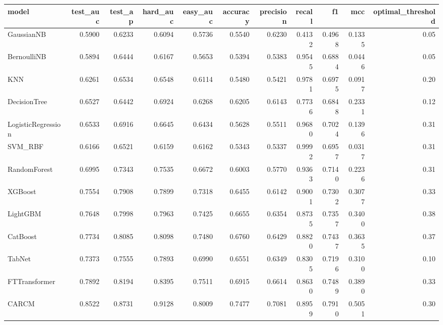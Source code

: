 \begin{tabular}{lrrrrrrrrrr}
\toprule
model & test_auc & test_ap & hard_auc & easy_auc & accuracy & precision & recall & f1 & mcc & optimal_threshold \\
\midrule
GaussianNB & 0.5900 & 0.6233 & 0.6094 & 0.5736 & 0.5540 & 0.6230 & 0.4132 & 0.4968 & 0.1335 & 0.05 \\
BernoulliNB & 0.5894 & 0.6444 & 0.6167 & 0.5653 & 0.5394 & 0.5383 & 0.9545 & 0.6884 & 0.0446 & 0.05 \\
KNN & 0.6261 & 0.6534 & 0.6548 & 0.6114 & 0.5480 & 0.5421 & 0.9781 & 0.6975 & 0.0917 & 0.20 \\
DecisionTree & 0.6527 & 0.6442 & 0.6924 & 0.6268 & 0.6205 & 0.6143 & 0.7736 & 0.6848 & 0.2331 & 0.12 \\
LogisticRegression & 0.6533 & 0.6916 & 0.6645 & 0.6434 & 0.5628 & 0.5511 & 0.9680 & 0.7024 & 0.1396 & 0.31 \\
SVM_RBF & 0.6166 & 0.6521 & 0.6159 & 0.6162 & 0.5343 & 0.5337 & 0.9992 & 0.6957 & 0.0317 & 0.31 \\
RandomForest & 0.6995 & 0.7343 & 0.7535 & 0.6672 & 0.6003 & 0.5770 & 0.9363 & 0.7140 & 0.2236 & 0.31 \\
XGBoost & 0.7554 & 0.7908 & 0.7899 & 0.7318 & 0.6455 & 0.6142 & 0.9001 & 0.7302 & 0.3077 & 0.33 \\
LightGBM & 0.7648 & 0.7998 & 0.7963 & 0.7425 & 0.6655 & 0.6354 & 0.8735 & 0.7357 & 0.3400 & 0.38 \\
CatBoost & 0.7734 & 0.8085 & 0.8098 & 0.7480 & 0.6760 & 0.6429 & 0.8820 & 0.7437 & 0.3635 & 0.37 \\
TabNet & 0.7373 & 0.7555 & 0.7893 & 0.6990 & 0.6551 & 0.6349 & 0.8305 & 0.7196 & 0.3100 & 0.10 \\
FTTransformer & 0.7892 & 0.8194 & 0.8395 & 0.7511 & 0.6915 & 0.6614 & 0.8630 & 0.7489 & 0.3890 & 0.33 \\
CARCM & 0.8522 & 0.8731 & 0.9128 & 0.8009 & 0.7477 & 0.7081 & 0.8959 & 0.7910 & 0.5051 & 0.30 \\
\bottomrule
\end{tabular}
